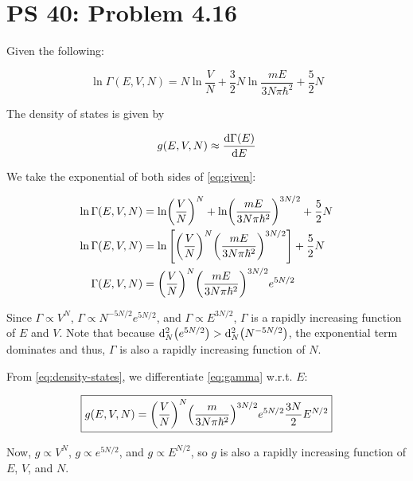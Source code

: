 \documentclass[12pt,a4paper]{article}
\begin{document}
\setcounter{page}{1}

\section*{PS 40: Problem 4.16}
\bigskip

Given the following:

\begin{equation}
	\ln \Gamma(E,V,N) = N \ln\frac{V}{N} + \frac{3}{2}N\ln\frac{mE}{3N\pi\hbar^2} + \frac{5}{2}N \label{eq:given}
\end{equation}

The density of states is given by

\begin{equation}
	g(E,V,N) \approx \dv{\Gamma(E)}{E} \label{eq:density-states}
\end{equation}

We take the exponential of both sides of \eqref{eq:given}:

\begin{align}
	\ln\Gamma(E,V,N) &= \ln(\frac{V}{N})^N + \ln(\frac{mE}{3N\pi\hbar^2})^{3N/2} + \frac{5}{2}N \nonumber \\
	\ln\Gamma(E,V,N) &= \ln\qty[\qty(\frac{V}{N})^N \qty(\frac{mE}{3N\pi\hbar^2})^{3N/2}] + \frac{5}{2}N \nonumber \\
	\Gamma(E,V,N) &= \qty(\frac{V}{N})^N \qty(\frac{mE}{3N\pi\hbar^2})^{3N/2} e^{5N/2} \label{eq:gamma}
\end{align}

Since $\Gamma \propto V^N$, $\Gamma \propto N^{-5N/2}e^{5N/2}$, and $\Gamma \propto E^{3N/2}$, $\Gamma$ is a rapidly increasing function of $E$ and $V$. Note that because $\dd[2]_N\qty(e^{5N/2}) > \dd[2]_N\qty(N^{-5N/2})$, the exponential term dominates and thus, $\Gamma$ is also a rapidly increasing function of $N$.

From \eqref{eq:density-states}, we differentiate \eqref{eq:gamma} w.r.t. $E$:

\begin{equation}
	\boxed{
		g(E,V,N) = \qty(\frac{V}{N})^N \qty(\frac{m}{3N\pi\hbar^2})^{3N/2} e^{5N/2} \frac{3N}{2} E^{N/2}
	} \label{eq:answer}
\end{equation}

Now, $g \propto V^N$, $g \propto e^{5N/2}$, and $g \propto E^{N/2}$, so $g$ is also a rapidly increasing function of $E$, $V$, and $N$.
\end{document}
